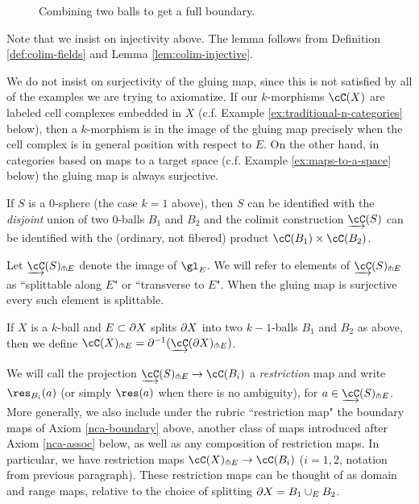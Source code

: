 \begin{figure}[t] \centering
{}
\caption{Combining two balls to get a full boundary.}\label{blah3}\end{figure}

Note that we insist on injectivity above. 
The lemma follows from Definition \ref{def:colim-fields} and Lemma \ref{lem:colim-injective}.

We do not insist on surjectivity of the gluing map, since this is not satisfied by all of the examples
we are trying to axiomatize.
If our $k$-morphisms $\cC(X)$ are labeled cell complexes embedded in $X$ (c.f. Example \ref{ex:traditional-n-categories} below), then a $k$-morphism is
in the image of the gluing map precisely when the cell complex is in general position
with respect to $E$. On the other hand, in categories based on maps to a target space (c.f. Example \ref{ex:maps-to-a-space} below) the gluing map is always surjective.

If $S$ is a 0-sphere (the case $k=1$ above), then $S$ can be identified with the {\it disjoint} union
of two 0-balls $B_1$ and $B_2$ and the colimit construction $\cl{\cC}(S)$ can be identified
with the (ordinary, not fibered) product $\cC(B_1) \times \cC(B_2)$.

Let $\cl{\cC}(S)\trans E$ denote the image of $\gl_E$.
We will refer to elements of $\cl{\cC}(S)\trans E$ as ``splittable along $E$" or ``transverse to $E$".  When the gluing map is surjective every such element is splittable.

If $X$ is a $k$-ball and $E \subset \partial X$ splits $\partial X$ into two $k{-}1$-balls $B_1$ and $B_2$
as above, then we define $\cC(X)\trans E = \bd^{-1}(\cl{\cC}(\bd X)\trans E)$.

We will call the projection $\cl{\cC}(S)\trans E \to \cC(B_i)$
a {\it restriction} map and write $\res_{B_i}(a)$
(or simply $\res(a)$ when there is no ambiguity), for $a\in \cl{\cC}(S)\trans E$.
More generally, we also include under the rubric ``restriction map"
the boundary maps of Axiom \ref{nca-boundary} above,
another class of maps introduced after Axiom \ref{nca-assoc} below, as well as any composition
of restriction maps.
In particular, we have restriction maps $\cC(X)\trans E \to \cC(B_i)$
($i = 1, 2$, notation from previous paragraph).
These restriction maps can be thought of as 
domain and range maps, relative to the choice of splitting $\partial X = B_1 \cup_E B_2$.


